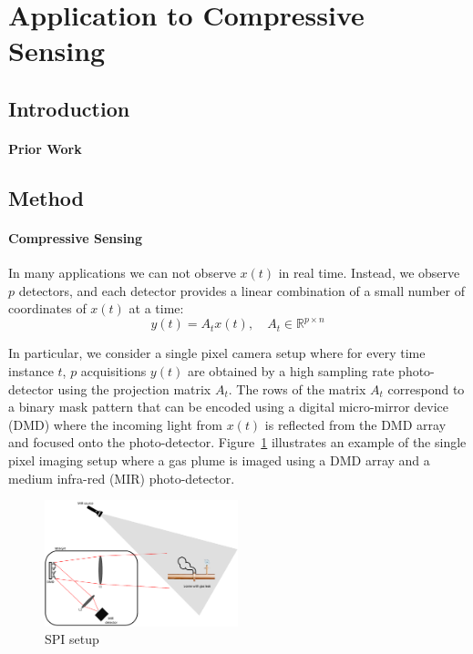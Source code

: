 \section{Application to Compressive Sensing}
\label{ch:cs}
\subsection{Introduction}
\paragraph{Prior Work}
\subsection{Method}
\paragraph{Compressive Sensing} In many applications we can not observe $x(t)$ in real time. Instead, we observe $p$ detectors, and each detector provides a linear combination of a small number of coordinates of $x(t)$ at a time:
\begin{equation}
    \label{eq:cs_definition}
    y(t) = A_t x(t), \quad A_t \in \mathbb{R}^{p\times n}
\end{equation}

In particular, we consider a single pixel camera setup where for every time instance $t$, $p$ acquisitions $y(t)$ are obtained by a high sampling rate photo-detector using the projection matrix $A_t$. The rows of the matrix $A_t$ correspond to a binary mask pattern that can be encoded using a digital micro-mirror device (DMD) where the incoming light from $x(t)$ is reflected from the DMD array and focused onto the photo-detector. Figure~\ref{fig:SPI} illustrates an example of the single pixel imaging setup where a gas plume is imaged using a DMD array and a medium infra-red (MIR) photo-detector. 
\begin{figure}
\centering
\includegraphics[width = 0.5\textwidth]{figures/SPI_setup.pdf}
\caption{SPI setup \label{fig:SPI}}
\end{figure}

